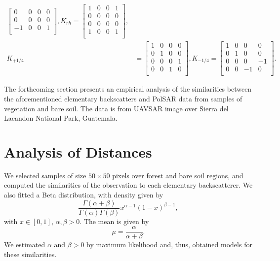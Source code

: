 \documentclass[conference]{IEEEtran}
\begin{document}
\begin{align*}
\begin{bmatrix}
0 & 0 & 0 & 0\\
0 & 0 & 0 & 0\\
-1 & 0 & 0 & 1\\
\end{bmatrix},
K_{rh}=
\begin{bmatrix}
1 & 0 & 0 & 1\\
0 & 0 & 0 & 0\\
0 & 0 & 0 & 0\\
1 & 0 & 0 & 1\\
\end{bmatrix}
,\\
K_{+1/4} &=
\begin{bmatrix}
1 & 0 & 0 & 0\\
0 & 1 & 0 & 0\\
0 & 0 & 0 & 1\\
0 & 0 & 1 & 0\\
\end{bmatrix},
K_{-1/4}=
\begin{bmatrix}
1 & 0 & 0 & 0\\
0 & 1 & 0 & 0\\
0 & 0 & 0 & -1\\
0 & 0 & -1 & 0\\
\end{bmatrix}
.
\end{align*}

The forthcoming section presents an empirical analysis of the similarities between the aforementioned elementary backscatters and PolSAR data from samples of vegetation and bare soil. 
The data is from UAVSAR image over Sierra del Lacandon National Park, Guatemala.

\section{Analysis of Distances}

We selected samples of size $50\times 50$ pixels over forest and bare soil regions, and computed the similarities of the observation to each elementary backscatterer.
We also fitted a Beta distribution, with density given by
$$
\frac{\Gamma(\alpha+\beta)}{\Gamma(\alpha)\Gamma(\beta)}x^{\alpha-1}(1-x)^{\beta-1},
$$
with $x \in [ 0,1]$, $\alpha,\beta>0$.
The mean is given by
\begin{equation}
  \mu = \frac{\alpha}{\alpha + \beta}.
  \label{eq:MeanBeta}
\end{equation}
We estimated $\alpha$ and $\beta>0$ by maximum likelihood and, thus, obtained models for these similarities.
\end{document}
